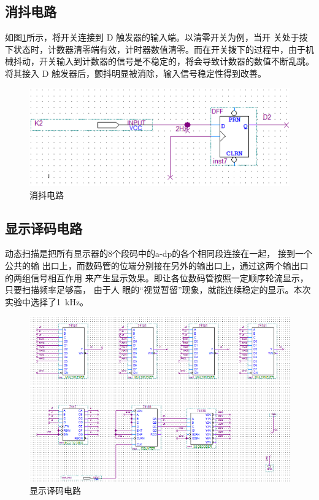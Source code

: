 \documentclass[twoside, openright]{article}
\begin{document}
\subsection{消抖电路}%
\label{sub:消抖电路}

如图\ref{fig:消抖电路}所示，将开关连接到 D 触发器的输入端。以清零开关为例，当开
关处于拨下状态时，计数器清零端有效，计时器数值清零。而在开关拨下的过程中，由于机
械抖动，开关输入到计数器的信号是不稳定的，将会导致计数器的数值不断乱跳。将其接入
D 触发器后，颤抖明显被消除，输入信号稳定性得到改善。

\begin{figure}[htbp]
	\centering
	\includegraphics[width = 0.6\linewidth]{tremble.png}
	\caption{消抖电路}
	\label{fig:消抖电路}
\end{figure}

\subsection{显示译码电路}%
\label{sub:显示译码电路}

动态扫描是把所有显示器的8个段码中的a-dp的各个相同段连接在一起， 接到一个公共的输
出口上，而数码管的位端分别接在另外的输出口上，通过这两个输出口的两组信号相互作用
来产生显示效果。即让各位数码管按照一定顺序轮流显示， 只要扫描频率足够高， 由于人
眼的“视觉暂留”现象，就能连续稳定的显示。本次实验中选择了\SI{1}{\kHz}。

\begin{figure}[htbp]
	\centering
	\includegraphics[width = 0.8\linewidth]{display.png}
	\caption{显示译码电路}
	\label{fig:显示译码电路}
\end{figure}
\end{document}
